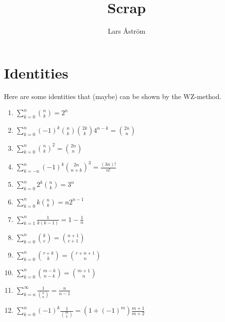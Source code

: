\documentclass[a4paper, 12pt]{article}
\title{Scrap}
\author{Lars Åström}
\date{} %
\begin{document}
\maketitle
\section{Identities}
Here are some identities that (maybe) can be shown by the WZ-method.
\begin{enumerate}
  \item $\sum_{k=0}^n \binom{n}{k} = 2^n$
  \item $\sum_{k=0}^n (-1)^k\binom{n}{k}\binom{2k}{k}4^{n-k}=\binom{2n}{n}$
  \item $\sum_{k=0}^n \binom{n}{k}^2 = \binom{2n}{n}$
  \item $\sum_{k=-n}^n (-1)^k\binom{2n}{n+k}^3 = \frac{(3n)!}{n!}$
  \item $\sum_{k=0}^n 2^k\binom{n}{k} = 3^n$
  \item $\sum_{k=0}^n k\binom{n}{k} = n2^{n-1}$
  \item $\sum_{k=1}^n \frac{1}{k(k-1)} = 1-\frac{1}{n}$
  \item $\sum_{k=0}^n \binom{k}{c} = \binom{n+1}{c+1}$
  \item $\sum_{k=0}^n \binom{r+k}{k} = \binom{r+n+1}{n}$
  \item $\sum_{k=0}^n \binom{m-k}{n-k} = \binom{m+1}{n}$
  \item $\sum_{k=n}^\infty \frac{1}{\binom{k}{n}}=\frac{n}{n-1}$
  \item $\sum_{k=0}^n (-1)^k\frac{1}{\binom{m}{k}}=(1+(-1)^m)\frac{m+1}{m+2}$
\end{enumerate}
\end{document}
